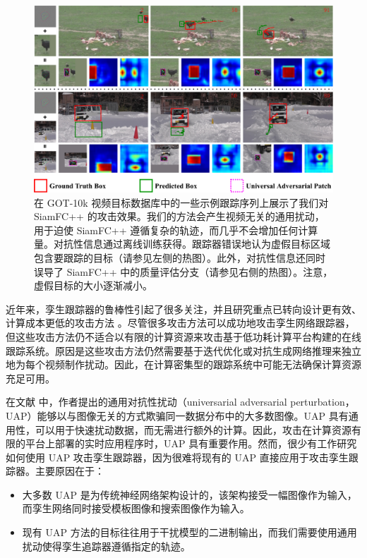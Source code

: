 \begin{figure}[thbp]
\centering
\includegraphics[width=1.0\textwidth]{Img/attack/1_v8.pdf}
\caption{在 GOT-10k 视频目标数据库中的一些示例跟踪序列上展示了我们对 SiamFC++ 的攻击效果。我们的方法会产生视频无关的通用扰动，用于迫使 SiamFC++ 遵循复杂的轨迹，而几乎不会增加任何计算量。对抗性信息通过离线训练获得。跟踪器错误地认为虚假目标区域包含要跟踪的目标（请参见左侧的热图）。此外，对抗性信息还同时误导了 SiamFC++ 中的质量评估分支（请参见右侧的热图）。注意，虚假目标的大小逐渐减小。} 
\label{fig:1}
\end{figure}

近年来，孪生跟踪器的鲁棒性引起了很多关注，并且研究重点已转向设计更有效、计算成本更低的攻击方法 \cite{TTP,FAN,SPARK}。尽管很多攻击方法可以成功地攻击孪生网络跟踪器，但这些攻击方法仍不适合以有限的计算资源来攻击基于低功耗计算平台构建的在线跟踪系统。原因是这些攻击方法仍然需要基于迭代优化或对抗生成网络推理来独立地为每个视频制作扰动。因此，在计算密集型的跟踪系统中可能无法确保计算资源充足可用。

在文献 \cite{UAP} 中，作者提出的通用对抗性扰动（universarial adversarial perturbation，UAP）能够以与图像无关的方式欺骗同一数据分布中的大多数图像。UAP 具有通用性，可以用于快速扰动数据，而无需进行额外的计算。因此，攻击在计算资源有限的平台上部署的实时应用程序时，UAP 具有重要作用。然而，很少有工作研究如何使用 UAP 攻击孪生跟踪器，因为很难将现有的 UAP 直接应用于攻击孪生跟踪器。主要原因在于：
\begin{itemize}
\item 大多数 UAP 是为传统神经网络架构设计的，该架构接受一幅图像作为输入，而孪生网络同时接受模板图像和搜索图像作为输入。
\item 现有 UAP 方法的目标往往用于干扰模型的二进制输出，而我们需要使用通用扰动使得孪生追踪器遵循指定的轨迹。
\end{itemize}

